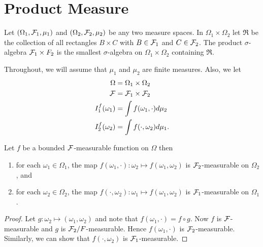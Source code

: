 \chapter{Product Measure}



\begin{definition}
Let $(\Omega_1, \mathcal F_1, \mu_1)$ and $(\Omega_2, \mathcal F_2, \mu_2)$ be any two measure 
spaces. In $\Omega_1\times \Omega_2$ let $\Re$ be the collection of all rectangles 
$B\times C$ with $B\in \mathcal F_1$ and $C\in \mathcal F_2$. The product $\sigma$-algebra $\mathcal F_1\times F_2$ is the smallest $\sigma$-algebra on $\Omega_1\times \Omega_2$ containing $\Re$.
\end{definition}



\begin{definition}
Throughout, we will assume that $\mu_1$ and $\mu_2$ are finite measures. Also, we let
\begin{align*}
\Omega &= \Omega_1\times \Omega_2\\
	\mathcal F &= \mathcal F_1\times \mathcal F_2\\
	I_1^f(\omega_1) & = \int f(\omega_1,\cdot)d\mu_2\\
	I_2^f(\omega_2)&=\int f(\cdot, \omega_2)d\mu_1.
\end{align*}
\end{definition}




\begin{lemma}
Let $f$ be a bounded $\mathcal F$-measurable function on $\Omega$ then
\begin{enumerate}
\item for each $\omega_1\in\Omega_1$, the map $f(\omega_1, \cdot): \omega_2\mapsto f(\omega_1, \omega_2)$ is $\mathcal F_2$-measurable on $\Omega_2$, and
\item for each $\omega_2\in \Omega_2$, the map $f(\cdot, \omega_2):\omega_1\mapsto f(\omega_1, \omega_2)$ is $\mathcal F_1$-measurable on $\Omega_1$.
\end{enumerate}
\end{lemma}



\begin{proof}
Let $g:\omega_2\mapsto (\omega_1, \omega_2)$ and note that $f(\omega_1, \cdot)=f\circ g$. Now $f$ is $\mathcal F$-measurable and $g$ is $\mathcal F_2/F$-measurable. Hence $f(\omega_1,\cdot)$ is $\mathcal F_2$-measurable. Similarly, we can show that $f(\cdot, \omega_2)$ is $\mathcal F_1$-measurable.
\end{proof}


